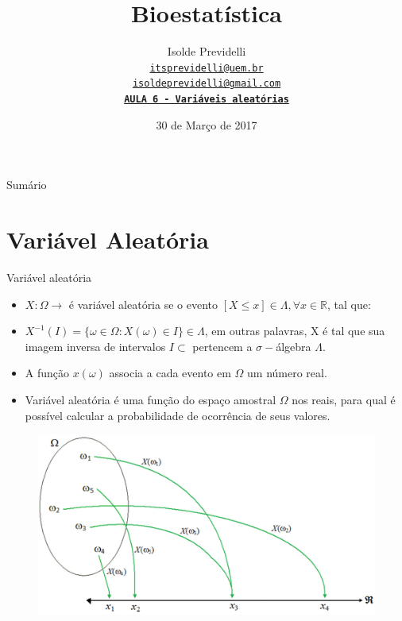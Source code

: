 \documentclass[9pt]{beamer}
\title[Bioestatística]{\bf Bioestatística\\
\vspace{.3\baselineskip}}
\subtitle[]{\bf}
\date{ 30 de Março de 2017}
\author[Isolde Previdelli]{
  Isolde Previdelli\\
  \href{itsprevidelli@uem.br}{{\tt itsprevidelli@uem.br \\
isoldeprevidelli@gmail.com \\ \vspace{8mm} \tt \textbf{\LARGE{AULA 6 -
    Variáveis aleatórias}}}}
}
\institute[PBE/UEM]{}
\begin{document}
{\pbebg
\begin{frame}
  \titlepage
\end{frame}}

\begin{frame}{Sumário}{}
\tableofcontents
\end{frame}

\section{Variável Aleatória}

\begin{frame}{Variável aleatória}{}

\begin{itemize}
\item $X:\Omega \rightarrow$ é variável aleatória se o evento $[X \leq x] \in
\Lambda, \forall x \in \mathbb{R}$, tal que:
\item $X^{-1}(I) = \{\omega \in \Omega : X(\omega) \in I\} \in \Lambda$,
  em outras palavras, X é tal que sua imagem inversa de intervalos
$I \subset$ pertencem a $\sigma-$álgebra $\Lambda$.
\item A função $x(\omega)$ associa a cada evento em $\Omega$ um número real.
\item Variável aleatória é uma função do espaço amostral $\Omega$
  nos reais, para qual é possível calcular a probabilidade de ocorrência
  de seus valores.
\end{itemize}

\begin{figure}[!htb]
    \centering
   \includegraphics[scale=0.55]{va.png}
  \end{figure}
\end{frame}
\end{document}

